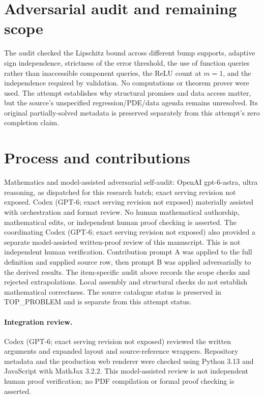 \documentclass[11pt]{article}
\begin{document}
\section{Adversarial audit and remaining scope}
The audit checked the Lipschitz bound across different bump
supports, adaptive sign independence, strictness of the error
threshold, the use of function queries rather than inaccessible
component queries, the ReLU count at $m=1$, and the independence
required by validation. No computations or theorem prover were
used. The attempt establishes why structural promises and data
access matter, but the source's unspecified regression/PDE/data
agenda remains unresolved. Its original partially-solved metadata
is preserved separately from this attempt's zero completion claim.

\section{Process and contributions}
Mathematics and model-assisted adversarial self-audit: OpenAI gpt-6-astra, ultra reasoning, as dispatched for this research batch; exact serving revision not exposed. Codex (GPT-6; exact serving revision not exposed) materially assisted with orchestration and format review. No human mathematical authorship, mathematical edits, or independent human proof checking is asserted.
The coordinating Codex (GPT-6; exact serving revision not exposed) also provided a separate model-assisted written-proof review of this manuscript. This is not independent human verification.
Contribution prompt A was applied to the full definition and supplied source row, then prompt B was applied adversarially to the derived results. The item-specific audit above records the scope checks and rejected extrapolations. Local assembly and structural checks do not establish mathematical correctness. The source catalogue status is preserved in TOP\_PROBLEM and is separate from this attempt status.
\paragraph{Integration review.} Codex (GPT-6; exact serving revision not exposed) reviewed the written arguments and expanded layout and source-reference wrappers. Repository metadata and the production web renderer were checked using Python 3.13 and JavaScript with MathJax 3.2.2. This model-assisted review is not independent human proof verification; no PDF compilation or formal proof checking is asserted.
\end{document}

